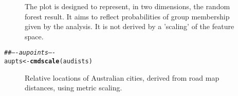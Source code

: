 \documentclass[12pt, a4paper,  BCOR=8.25mm, DIV=15]{scrartcl}\usepackage[]{graphicx}\usepackage[]{color}
\makeatletter
\newcommand{\hlcom}[1]{\textcolor[rgb]{0.678,0.584,0.686}{\textit{#1}}}%
\newcommand{\hlstd}[1]{\textcolor[rgb]{0.345,0.345,0.345}{#1}}%
\newcommand{\hlkwb}[1]{\textcolor[rgb]{0.69,0.353,0.396}{#1}}%
\newcommand{\hlkwd}[1]{\textcolor[rgb]{0.737,0.353,0.396}{\textbf{#1}}}%
\newenvironment{kframe}{%
 \def\at@end@of@kframe{}%
 \ifinner\ifhmode%
  \def\at@end@of@kframe{\end{minipage}}%
  \begin{minipage}{\columnwidth}%
 \fi\fi%
 \def\FrameCommand##1{\hskip\@totalleftmargin \hskip-\fboxsep
 \colorbox{shadecolor}{##1}\hskip-\fboxsep
     \hskip-\linewidth \hskip-\@totalleftmargin \hskip\columnwidth}%
 \MakeFramed {\advance\hsize-\width
   \@totalleftmargin\z@ \linewidth\hsize
   \@setminipage}}%
 {\par\unskip\endMakeFramed%
 \at@end@of@kframe}
\newenvironment{knitrout}{}{} %
\makeatother
\begin{document}
\begin{figure}

\caption{The plot is designed to represent, in two dimensions, the random
  forest result. It aims to reflect probabilities of group membership
  given by the analysis.  It is not derived by a 'scaling' of the
  feature space.
}\label{fig:rfbronchit}
\end{figure}

\begin{knitrout}
\color{fgcolor}\begin{kframe}
\begin{alltt}
\hlcom{## ---- aupoints ----}
\hlstd{aupts} \hlkwb{<-} \hlkwd{cmdscale}\hlstd{(audists)}
\end{alltt}
\end{kframe}
\end{knitrout}

\begin{figure}

\caption{Relative locations of Australian cities, derived from road
  map distances, using metric scaling.\label{fig:audists}}
\end{figure}



\begin{figure*}[h]

      \caption{In Panel A, Figure \ref{fig:audists} has been rotated and
        scaled, to give a best fit to a map of Australia.  Each city
        moves as shown by the line that radiates out from it.  Panel B
        is the equivalent plot for the Sammon scaling ordination.
\label{fig:aufit}}
\end{figure*}
\end{document}
